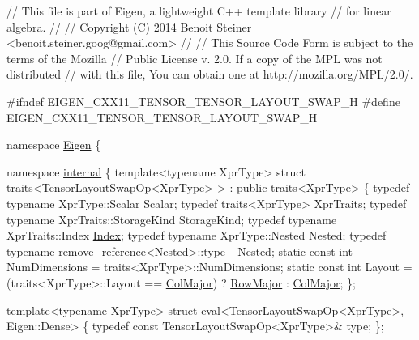 \begin{DoxyCodeInclude}
\textcolor{comment}{// This file is part of Eigen, a lightweight C++ template library}
\textcolor{comment}{// for linear algebra.}
\textcolor{comment}{//}
\textcolor{comment}{// Copyright (C) 2014 Benoit Steiner <benoit.steiner.goog@gmail.com>}
\textcolor{comment}{//}
\textcolor{comment}{// This Source Code Form is subject to the terms of the Mozilla}
\textcolor{comment}{// Public License v. 2.0. If a copy of the MPL was not distributed}
\textcolor{comment}{// with this file, You can obtain one at http://mozilla.org/MPL/2.0/.}

\textcolor{preprocessor}{#ifndef EIGEN\_CXX11\_TENSOR\_TENSOR\_LAYOUT\_SWAP\_H}
\textcolor{preprocessor}{#define EIGEN\_CXX11\_TENSOR\_TENSOR\_LAYOUT\_SWAP\_H}

\textcolor{keyword}{namespace }\hyperlink{namespace_eigen}{Eigen} \{

\textcolor{keyword}{namespace }\hyperlink{namespaceinternal}{internal} \{
\textcolor{keyword}{template}<\textcolor{keyword}{typename} XprType>
\textcolor{keyword}{struct }traits<TensorLayoutSwapOp<XprType> > : \textcolor{keyword}{public} traits<XprType>
\{
  \textcolor{keyword}{typedef} \textcolor{keyword}{typename} XprType::Scalar Scalar;
  \textcolor{keyword}{typedef} traits<XprType> XprTraits;
  \textcolor{keyword}{typedef} \textcolor{keyword}{typename} XprTraits::StorageKind StorageKind;
  \textcolor{keyword}{typedef} \textcolor{keyword}{typename} XprTraits::Index \hyperlink{namespace_eigen_a62e77e0933482dafde8fe197d9a2cfde}{Index};
  \textcolor{keyword}{typedef} \textcolor{keyword}{typename} XprType::Nested Nested;
  \textcolor{keyword}{typedef} \textcolor{keyword}{typename} remove\_reference<Nested>::type \_Nested;
  \textcolor{keyword}{static} \textcolor{keyword}{const} \textcolor{keywordtype}{int} NumDimensions = traits<XprType>::NumDimensions;
  \textcolor{keyword}{static} \textcolor{keyword}{const} \textcolor{keywordtype}{int} Layout = (traits<XprType>::Layout == \hyperlink{group__enums_ggaacded1a18ae58b0f554751f6cdf9eb13a0cbd4bdd0abcfc0224c5fcb5e4f6669a}{ColMajor}) ? 
      \hyperlink{group__enums_ggaacded1a18ae58b0f554751f6cdf9eb13acfcde9cd8677c5f7caf6bd603666aae3}{RowMajor} : \hyperlink{group__enums_ggaacded1a18ae58b0f554751f6cdf9eb13a0cbd4bdd0abcfc0224c5fcb5e4f6669a}{ColMajor};
\};

\textcolor{keyword}{template}<\textcolor{keyword}{typename} XprType>
\textcolor{keyword}{struct }eval<TensorLayoutSwapOp<XprType>, Eigen::Dense>
\{
  \textcolor{keyword}{typedef} \textcolor{keyword}{const} TensorLayoutSwapOp<XprType>& type;
\};


\end{DoxyCodeInclude}
